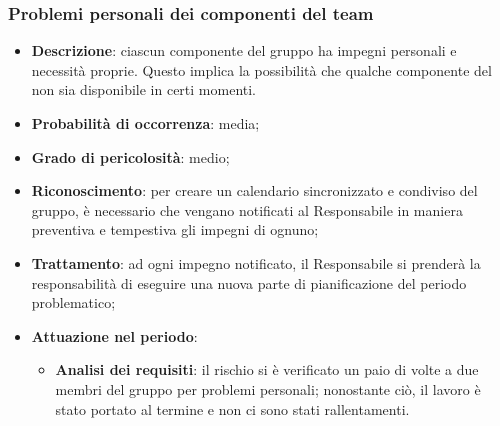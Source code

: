 		\subsubsection{Problemi personali dei componenti del team}
		\begin{itemize}
			\item \textbf{Descrizione}: ciascun componente del gruppo ha impegni personali e necessità proprie. Questo implica la possibilità che qualche componente del  non sia disponibile in certi momenti.
			\item \textbf{Probabilità di occorrenza}: media;
			\item \textbf{Grado di pericolosità}: medio;
			\item \textbf{Riconoscimento}: per creare un calendario sincronizzato e condiviso del gruppo, è necessario che vengano notificati al Responsabile in maniera preventiva e tempestiva gli impegni di ognuno;
			\item \textbf{Trattamento}: ad ogni impegno notificato, il Responsabile si prenderà la responsabilità di eseguire una nuova parte di pianificazione del periodo problematico; 
			\item \textbf{Attuazione nel periodo}:
			\begin{itemize}
				\item \textbf{Analisi dei requisiti}: il rischio si è verificato un paio di volte a due membri del gruppo per problemi personali; nonostante ciò, il lavoro è stato portato al termine e non ci sono stati rallentamenti.
			\end{itemize}
		\end{itemize}
